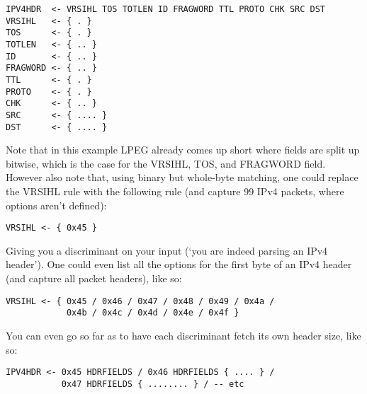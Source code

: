 \begin{changemargin}{-60mm}{0mm}
\begin{myquote}
\begin{verbatim}
IPV4HDR  <- VRSIHL TOS TOTLEN ID FRAGWORD TTL PROTO CHK SRC DST
VRSIHL   <- { . }
TOS      <- { . }
TOTLEN   <- { .. }
ID       <- { .. }
FRAGWORD <- { .. }
TTL      <- { . }
PROTO    <- { . }
CHK      <- { .. }
SRC      <- { .... }
DST      <- { .... }
\end{verbatim}
\end{myquote}
\end{changemargin}

Note that in this example LPEG already comes up short where fields are 
split up bitwise, which is the case for the VRSIHL, TOS, and FRAGWORD 
field. However also note that, using binary but whole-byte matching, one 
could replace the VRSIHL rule with the following rule (and capture 99%
IPv4 packets, where options aren’t defined):

\begin{changemargin}{-60mm}{0mm}
\begin{myquote}
\begin{verbatim}
VRSIHL <- { 0x45 }
\end{verbatim}
\end{myquote}
\end{changemargin}

Giving you a discriminant on your input (‘you are indeed parsing an IPv4 
header’). One could even list all the options for the first byte of an 
IPv4 header (and capture all packet headers), like so:

\begin{changemargin}{-60mm}{0mm}
\begin{myquote}
\begin{verbatim}
VRSIHL <- { 0x45 / 0x46 / 0x47 / 0x48 / 0x49 / 0x4a /
            0x4b / 0x4c / 0x4d / 0x4e / 0x4f }
\end{verbatim}
\end{myquote}
\end{changemargin}

You can even go so far as to have each discriminant fetch its own header 
size, like so:

\begin{changemargin}{-60mm}{0mm}
\begin{myquote}
\begin{verbatim}
IPV4HDR <- 0x45 HDRFIELDS / 0x46 HDRFIELDS { .... } /
           0x47 HDRFIELDS { ........ } / -- etc
\end{verbatim}
\end{myquote}
\end{changemargin}

